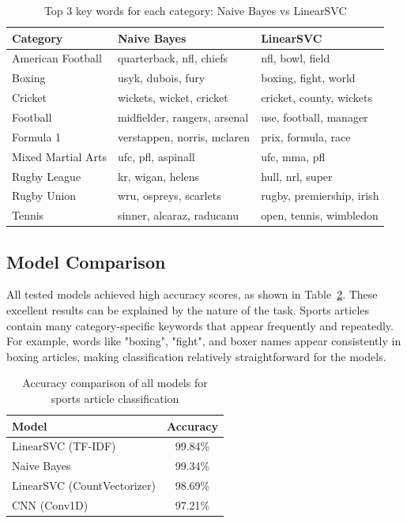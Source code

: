 \documentclass[12pt,a4paper]{article}
\begin{document}
\begin{table}[h]
\centering
\begin{tabular}{lll}
\toprule
Category & Naive Bayes & LinearSVC \\
\midrule
American Football & quarterback, nfl, chiefs & nfl, bowl, field \\
Boxing & usyk, dubois, fury & boxing, fight, world \\
Cricket & wickets, wicket, cricket & cricket, county, wickets \\
Football & midfielder, rangers, arsenal & use, football, manager \\
Formula 1 & verstappen, norris, mclaren & prix, formula, race \\
Mixed Martial Arts & ufc, pfl, aspinall & ufc, mma, pfl \\
Rugby League & kr, wigan, helens & hull, nrl, super \\
Rugby Union & wru, ospreys, scarlets & rugby, premiership, irish \\
Tennis & sinner, alcaraz, raducanu & open, tennis, wimbledon \\
\bottomrule
\end{tabular}
\caption{Top 3 key words for each category: Naive Bayes vs LinearSVC}
\label{tab:sports_keywords}
\end{table}
\newpage
\subsection{Model Comparison}

All tested models achieved high accuracy scores, as shown in Table~\ref{tab:sports_comparison}. These excellent results can be explained by the nature of the task. Sports articles contain many category-specific keywords that appear frequently and repeatedly. For example, words like "boxing", "fight", and boxer names appear consistently in boxing articles, making classification relatively straightforward for the models.

\begin{table}[h]
\centering
\begin{tabular}{lc}
\toprule
Model & Accuracy \\
\midrule
LinearSVC (TF-IDF) & 99.84\% \\
Naive Bayes & 99.34\% \\
LinearSVC (CountVectorizer) & 98.69\% \\
CNN (Conv1D) & 97.21\% \\
\bottomrule
\end{tabular}
\caption{Accuracy comparison of all models for sports article classification}
\label{tab:sports_comparison}
\end{table}
\end{document}
